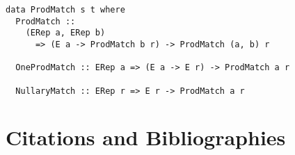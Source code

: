\documentclass[acmsmall]{acmart}
\providecommand\BibTeX{{%
    \normalfont B\kern-0.5em{\scshape i\kern-0.25em b}\kern-0.8em\TeX}}}
\begin{document}
\begin{lstlisting}
data ProdMatch s t where
  ProdMatch ::
    (ERep a, ERep b)
      => (E a -> ProdMatch b r) -> ProdMatch (a, b) r

  OneProdMatch :: ERep a => (E a -> E r) -> ProdMatch a r

  NullaryMatch :: ERep r => E r -> ProdMatch a r
\end{lstlisting}


\section{Citations and Bibliographies}


%   
%   

\end{document}
